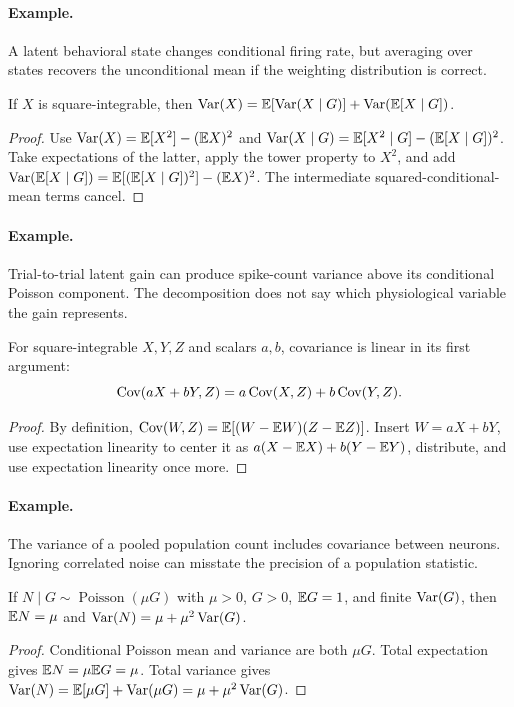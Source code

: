 \paragraph{Example.} A latent behavioral state changes conditional firing rate, but averaging over states recovers the unconditional mean if the weighting distribution is correct.

\begin{theorem}If $X$ is square-integrable, then $\operatorname{Var}(X)=\mathbb E[\operatorname{Var}(X\mid G)]+\operatorname{Var}(\mathbb E[X\mid G])$.\end{theorem}
\begin{proof}Use $\operatorname{Var}(X)=\mathbb E[X^2]-(\mathbb E X)^2$ and $\operatorname{Var}(X\mid G)=\mathbb E[X^2\mid G]-(\mathbb E[X\mid G])^2$. Take expectations of the latter, apply the tower property to $X^2$, and add $\operatorname{Var}(\mathbb E[X\mid G])=\mathbb E[(\mathbb E[X\mid G])^2]-(\mathbb E X)^2$. The intermediate squared-conditional-mean terms cancel.\end{proof}
\paragraph{Example.} Trial-to-trial latent gain can produce spike-count variance above its conditional Poisson component. The decomposition does not say which physiological variable the gain represents.

\begin{proposition}For square-integrable $X,Y,Z$ and scalars $a,b$, covariance is linear in its first argument:
\[
\operatorname{Cov}(aX+bY,Z)=a\operatorname{Cov}(X,Z)+b\operatorname{Cov}(Y,Z).
\]
\end{proposition}
\begin{proof}By definition, $\operatorname{Cov}(W,Z)=\mathbb E[(W-\mathbb E W)(Z-\mathbb E Z)]$. Insert $W=aX+bY$, use expectation linearity to center it as $a(X-\mathbb E X)+b(Y-\mathbb E Y)$, distribute, and use expectation linearity once more.\end{proof}
\paragraph{Example.} The variance of a pooled population count includes covariance between neurons. Ignoring correlated noise can misstate the precision of a population statistic.

\begin{proposition}If $N\mid G\sim\operatorname{Poisson}(\mu G)$ with $\mu>0$, $G>0$, $\mathbb E G=1$, and finite $\operatorname{Var}(G)$, then $\mathbb E N=\mu$ and $\operatorname{Var}(N)=\mu+\mu^2\operatorname{Var}(G)$.\end{proposition}
\begin{proof}Conditional Poisson mean and variance are both $\mu G$. Total expectation gives $\mathbb E N=\mu\mathbb E G=\mu$. Total variance gives $\operatorname{Var}(N)=\mathbb E[\mu G]+\operatorname{Var}(\mu G)=\mu+\mu^2\operatorname{Var}(G)$.\end{proof}

